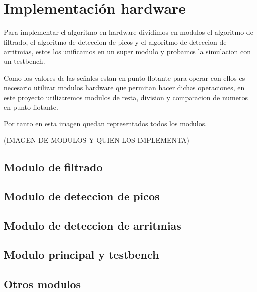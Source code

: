 \chapter{Implementación hardware}

Para implementar el algoritmo en hardware dividimos en modulos el algoritmo de filtrado, el algoritmo
de deteccion de picos y el algoritmo de deteccion de arritmias, estos los unificamos en un super modulo 
y probamos la simulacion con un testbench.

Como los valores de las señales estan en punto flotante para operar con ellos es necesario utilizar modulos
hardware que permitan hacer dichas operaciones, en este proyecto utilizaremos modulos de resta, division y 
comparacion de numeros en punto flotante.

Por tanto en esta imagen quedan representados todos los modulos.

(IMAGEN DE MODULOS Y QUIEN LOS IMPLEMENTA)

\section{Modulo de filtrado}

\section{Modulo de deteccion de picos}

\section{Modulo de deteccion de arritmias}

\section{Modulo principal y testbench}

\section{Otros modulos}



